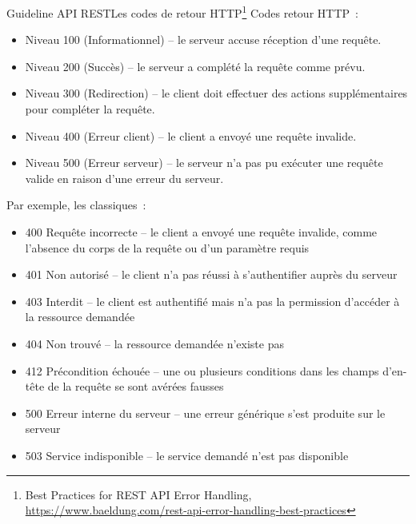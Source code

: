 \documentclass{beamer}
\begin{document}
    \begin{frame}{Guideline API REST}{Les codes de retour HTTP\footnote{Best Practices for REST API Error Handling, \url{https://www.baeldung.com/rest-api-error-handling-best-practices}}}
        Codes retour HTTP~:
        \begin{tiny}
            \begin{itemize}
                \item Niveau 100 (Informationnel) – le serveur accuse réception d'une requête.
                \item Niveau 200 (Succès) – le serveur a complété la requête comme prévu.
                \item Niveau 300 (Redirection) – le client doit effectuer des actions supplémentaires pour compléter la requête.
                \item Niveau 400 (Erreur client) – le client a envoyé une requête invalide.
                \item Niveau 500 (Erreur serveur) – le serveur n'a pas pu exécuter une requête valide en raison d'une erreur du serveur.
            \end{itemize}
        \end{tiny}
        Par exemple, les classiques~:
        \begin{tiny}
            \begin{itemize}
                \item 400 Requête incorrecte – le client a envoyé une requête invalide, comme l'absence du corps de la requête ou d'un paramètre requis
                \item 401 Non autorisé – le client n'a pas réussi à s'authentifier auprès du serveur
                \item 403 Interdit – le client est authentifié mais n'a pas la permission d'accéder à la ressource demandée
                \item 404 Non trouvé – la ressource demandée n'existe pas
                \item 412 Précondition échouée – une ou plusieurs conditions dans les champs d'en-tête de la requête se sont avérées fausses
                \item 500 Erreur interne du serveur – une erreur générique s'est produite sur le serveur
                \item 503 Service indisponible – le service demandé n'est pas disponible
            \end{itemize}
        \end{tiny}
    \end{frame}
\end{document}
